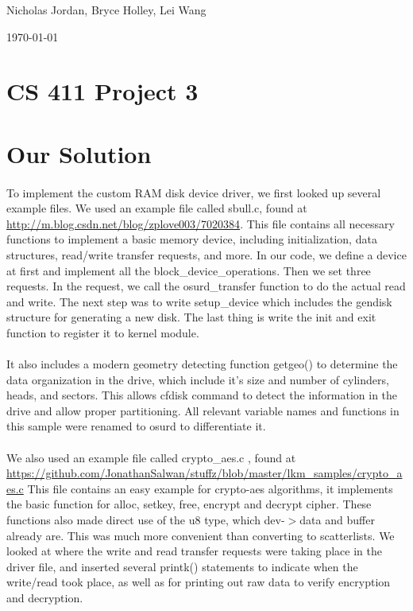 \documentclass[letterpaper,10pt]{article}
\def\name{Nicholas Jordan, Bryce Holley, Lei Wang}
\begin{document}
\hfill \name

\hfill \today

\section*{CS 411 Project 3}
\section*{Our Solution}
\paragraph{} 
To implement the custom RAM disk device driver, we first looked up several example files. We used an example file called sbull.c, found at \url{http://m.blog.csdn.net/blog/zplove003/7020384}.
This file contains all necessary functions to implement a basic memory device, including initialization, data structures, read/write transfer requests, and more. In our code, we define a device at first and implement all the  block\_device\_operations. Then we set three requests. In the request, we call the osurd\_transfer function to do the actual read and write. The next step was to write setup\_device which includes the gendisk structure for generating a new disk. The last thing is write the init and exit function to register it to kernel module. 

\paragraph{} 
It also includes a modern geometry detecting function getgeo() to determine the data organization in the drive, which include it’s size and number of cylinders, heads, and sectors. This allows cfdisk command to detect the information in the drive and allow proper partitioning. All relevant variable names and functions in this sample were renamed to osurd to differentiate it. 

\paragraph{} 
We also used an example file called crypto\_aes.c , found at \url{https://github.com/JonathanSalwan/stuffz/blob/master/lkm_samples/crypto_aes.c}
This file contains an easy example for crypto-aes algorithms, it implements the basic function for alloc, setkey, free, encrypt and decrypt cipher. These functions also made direct use of the u8 type, which dev-$>$data and buffer already are. This was much more convenient than converting to scatterlists. We looked at where the write and read transfer requests were taking place in the driver file, and inserted several printk() statements to indicate when the write/read took place, as well as for printing out raw data to verify encryption and decryption. 
\end{document}
